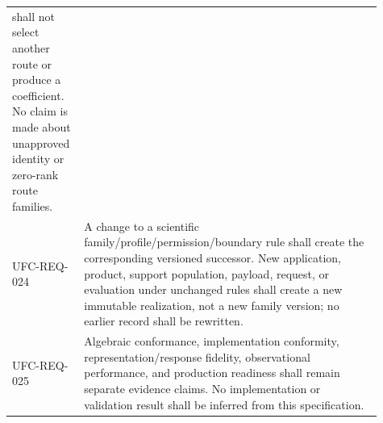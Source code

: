 \begin{longtable}{p{0.15\linewidth}p{0.76\linewidth}}
shall not select another route or produce a coefficient. No claim is made
about unapproved identity or zero-rank route families.\\
UFC-REQ-024 & A change to a scientific family/profile/permission/boundary rule
shall create the corresponding versioned successor. New application, product,
support population, payload, request, or evaluation under unchanged rules
shall create a new immutable realization, not a new family version; no earlier
record shall be rewritten.\\
UFC-REQ-025 & Algebraic conformance, implementation conformity,
representation/response fidelity, observational performance, and production
readiness shall remain separate evidence claims. No implementation or
validation result shall be inferred from this specification.\\
\bottomrule
\end{longtable}

\fi
